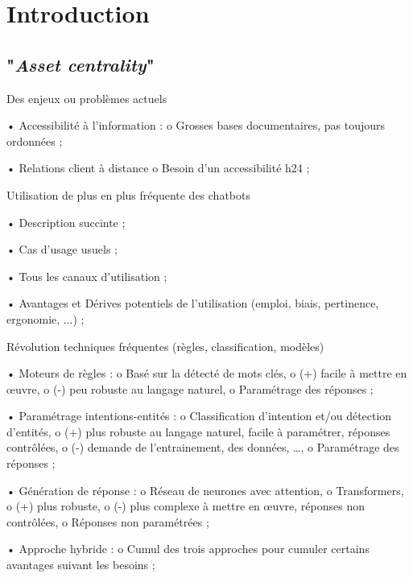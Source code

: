 \chapter*{Introduction}
    \label{chapter:INTRODUCTION}

    \section{"\textit{Asset centrality}"}

    \begin{todolist}
    
        \item Des enjeux ou problèmes actuels

            •	Accessibilité à l'information :
                o	Grosses bases documentaires, pas toujours ordonnées ;

            •	Relations client à distance
                o   Besoin d'un accessibilité h24 ;

        \item Utilisation de plus en plus fréquente des chatbots
        
            •   Description succinte ;

            •   Cas d'usage usuels ;

            •   Tous les canaux d'utilisation ;

            •   Avantages et Dérives potentiels de l'utilisation (emploi, biais, pertinence, ergonomie, ...) ;

        \item Révolution techniques fréquentes (règles, classification, modèles)

            •	Moteurs de règles :
                o	Basé sur la détecté de mots clés,
                o	(+) facile à mettre en œuvre,
                o	(-) peu robuste au langage naturel,
                o	Paramétrage des réponses ;

            •	Paramétrage intentions-entités :
                o	Classification d’intention et/ou détection d’entités,
                o	(+) plus robuste au langage naturel, facile à paramétrer, réponses contrôlées,
                o	(-) demande de l’entrainement, des données, …,
                o	Paramétrage des réponses ;

            •	Génération de réponse :
                o	Réseau de neurones avec attention,
                o	Transformers,
                o	(+) plus robuste,
                o	(-) plus complexe à mettre en œuvre, réponses non contrôlées,
                o	Réponses non paramétrées ;

            •	Approche hybride :
                o   Cumul des trois approches pour cumuler certains avantages suivant les besoins ;
	\end{todolist}

